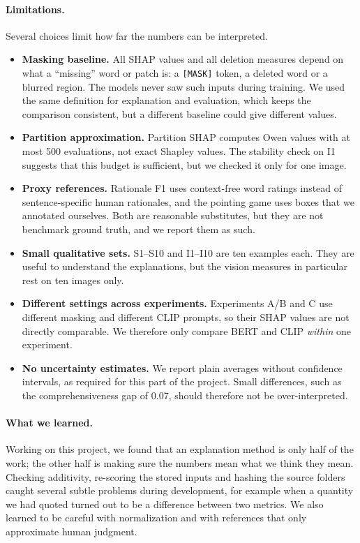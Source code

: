 \documentclass[11pt,a4paper]{article}
\begin{document}
\paragraph{Limitations.} Several choices limit how far the numbers can be interpreted.
\begin{itemize}[leftmargin=*]
  \item \textbf{Masking baseline.} All SHAP values and all deletion measures depend on what a
        ``missing'' word or patch is: a \texttt{[MASK]} token, a deleted word or a blurred
        region. The models never saw such inputs during training. We used the same
        definition for explanation and evaluation, which keeps the comparison consistent,
        but a different baseline could give different values.
  \item \textbf{Partition approximation.} Partition SHAP computes Owen values with at most 500
        evaluations, not exact Shapley values. The stability check on I1 suggests that this
        budget is sufficient, but we checked it only for one image.
  \item \textbf{Proxy references.} Rationale F1 uses context-free word ratings instead of
        sentence-specific human rationales, and the pointing game uses boxes that we
        annotated ourselves. Both are reasonable substitutes, but they are not benchmark
        ground truth, and we report them as such.
  \item \textbf{Small qualitative sets.} S1--S10 and I1--I10 are ten examples each. They are
        useful to understand the explanations, but the vision measures in particular rest on
        ten images only.
  \item \textbf{Different settings across experiments.} Experiments A/B and C use different
        masking and different CLIP prompts, so their SHAP values are not directly
        comparable. We therefore only compare BERT and CLIP \emph{within} one experiment.
  \item \textbf{No uncertainty estimates.} We report plain averages without confidence
        intervals, as required for this part of the project. Small differences, such as the
        comprehensiveness gap of 0.07, should therefore not be over-interpreted.
\end{itemize}

\paragraph{What we learned.} Working on this project, we found that an explanation method
is only half of the work; the other half is making sure the numbers mean what we think
they mean. Checking additivity, re-scoring the stored inputs and hashing the source
folders caught several subtle problems during development, for example when a quantity we
had quoted turned out to be a difference between two metrics. We also learned to be careful
with normalization and with references that only approximate human judgment.
\end{document}
